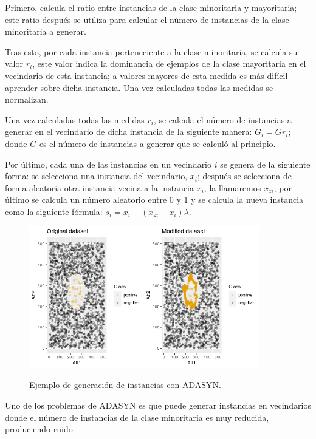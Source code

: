 Primero, calcula el ratio entre instancias de la clase minoritaria y mayoritaria; este ratio después se utiliza para calcular el número de instancias de la clase minoritaria a generar.\newline

Tras esto, por cada instancia perteneciente a la clase minoritaria, se calcula su valor $r_i$, este valor indica la dominancia de ejemplos de la clase mayoritaria en el vecindario de esta instancia; a valores mayores de esta medida es más difícil aprender sobre dicha instancia. Una vez calculadas todas las medidas se normalizan.\newline

Una vez calculadas todas las medidas $r_i$, se calcula el número de instancias a generar en el vecindario de dicha instancia de la siguiente manera: $G_i = G r_i$; donde $G$ es el número de instancias a generar que se calculó al principio.\newline
\newpage

Por último, cada una de las instancias en un vecindario $i$ se genera de la siguiente forma: se selecciona una instancia del vecindario, $x_i$; después se selecciona de forma aleatoria otra instancia vecina a la instancia $x_i$, la llamaremos $x_{zi}$; por último se calcula un número aleatorio entre 0 y 1 y se calcula la nueva instancia como la siguiente fórmula: $ s_i = x_i + (x_{zi}-x_i)\lambda$.\newline

\begin{figure}[h]
	\centering
	\includegraphics[width=100mm]{imagenes/ADASYN_comparison.png}
	\label{fig:43}
	\caption{Ejemplo de generación de instancias con ADASYN.}
\end{figure}
\verticalspace

Uno de los problemas de ADASYN es que puede generar instancias en vecindarios donde el número de instancias de la clase minoritaria es muy reducida, produciendo ruido.
